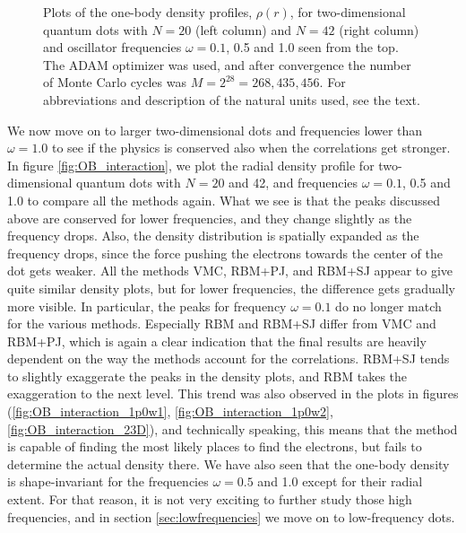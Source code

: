\begin{figure}
	\caption{Plots of the one-body density profiles, $\rho(r)$, for two-dimensional quantum dots with $N=20$ (left column) and $N=42$ (right column) and oscillator frequencies $\omega=0.1$, 0.5 and 1.0 seen from the top. The ADAM optimizer was used, and after convergence the number of Monte Carlo cycles was $M=2^{28}=268,435,456$. For  abbreviations and description of the natural units used, see the text.}
	\label{fig:OB_interaction}
\end{figure}

We now move on to larger two-dimensional dots and frequencies lower than $\omega=1.0$ to see if the physics is conserved also when the correlations get stronger. In figure \eqref{fig:OB_interaction}, we plot the radial density profile for two-dimensional quantum dots with $N=20$ and 42, and frequencies $\omega=0.1$, 0.5 and 1.0 to compare all the methods again. What we see is that the peaks discussed above are conserved for lower frequencies, and they change slightly as the frequency drops. Also, the density distribution is spatially expanded as the frequency drops, since the force pushing the electrons towards the center of the dot gets weaker. All the methods VMC, RBM+PJ, and RBM+SJ appear to give quite similar density plots, but for lower frequencies, the difference gets gradually more visible. In particular, the peaks for frequency $\omega=0.1$ do no longer match for the various methods. Especially RBM and RBM+SJ differ from VMC and RBM+PJ, which is again a clear indication that the final results are heavily dependent on the way the methods account for the correlations. RBM+SJ tends to slightly exaggerate the peaks in the density plots, and RBM takes the exaggeration to the next level. This trend was also observed in the plots in figures (\ref{fig:OB_interaction_1p0w1}, \ref{fig:OB_interaction_1p0w2}, \ref{fig:OB_interaction_23D}), and technically speaking, this means that the method is capable of finding the most likely places to find the electrons, but fails to determine the actual density there. We have also seen that the one-body density is shape-invariant for the frequencies $\omega=0.5$ and 1.0 except for their radial extent. For that reason, it is not very exciting to further study those high frequencies, and in section \ref{sec:lowfrequencies} we move on to low-frequency dots.

